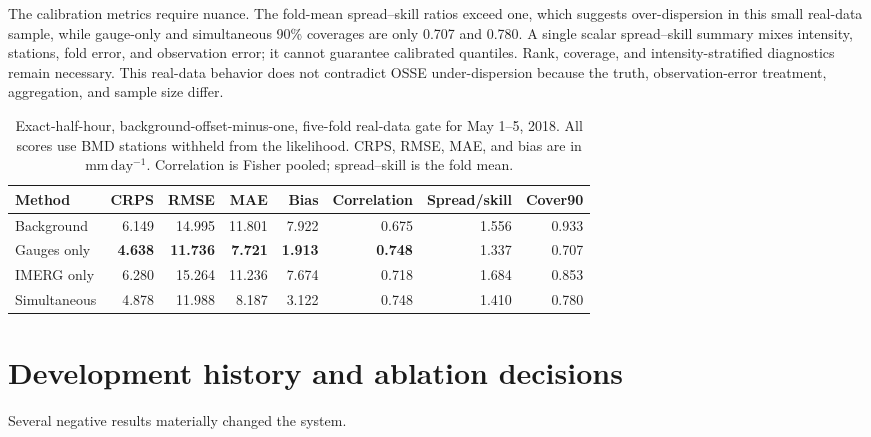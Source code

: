 \documentclass[10pt,twocolumn]{article}
\newcommand{\mmday}{\mathrm{mm\,day^{-1}}}
\begin{document}
The calibration metrics require nuance. The fold-mean spread--skill ratios exceed one, which suggests over-dispersion in this small real-data sample, while gauge-only and simultaneous 90\% coverages are only 0.707 and 0.780. A single scalar spread--skill summary mixes intensity, stations, fold error, and observation error; it cannot guarantee calibrated quantiles. Rank, coverage, and intensity-stratified diagnostics remain necessary. This real-data behavior does not contradict OSSE under-dispersion because the truth, observation-error treatment, aggregation, and sample size differ.

\begin{table}[t]
\centering
\caption{Exact-half-hour, background-offset-minus-one, five-fold real-data gate for May 1--5, 2018. All scores use BMD stations withheld from the likelihood. CRPS, RMSE, MAE, and bias are in $\mmday$. Correlation is Fisher pooled; spread--skill is the fold mean.}
\label{tab:real}
\small
\begin{tabular}{lrrrrrrr}
\toprule
Method & CRPS & RMSE & MAE & Bias & Correlation & Spread/skill & Cover90 \\
\midrule
Background & 6.149 & 14.995 & 11.801 & 7.922 & 0.675 & 1.556 & 0.933 \\
Gauges only & \textbf{4.638} & \textbf{11.736} & \textbf{7.721} & \textbf{1.913} & \textbf{0.748} & 1.337 & 0.707 \\
IMERG only & 6.280 & 15.264 & 11.236 & 7.674 & 0.718 & 1.684 & 0.853 \\
Simultaneous & 4.878 & 11.988 & 8.187 & 3.122 & 0.748 & 1.410 & 0.780 \\
\bottomrule
\end{tabular}
\end{table}

\section{Development history and ablation decisions}

Several negative results materially changed the system.
\end{document}
